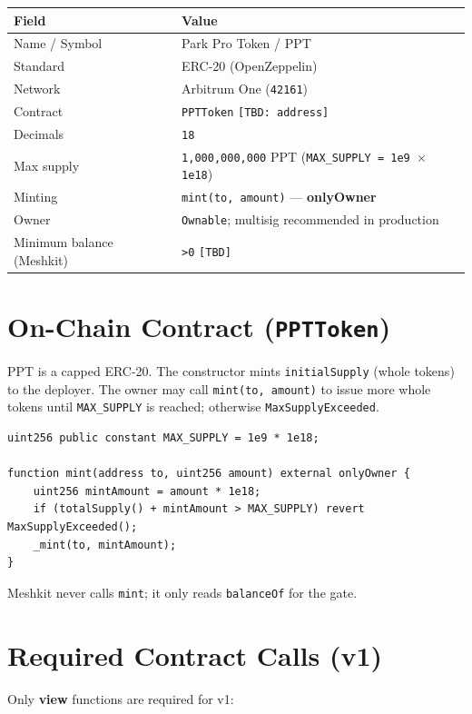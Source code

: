 \documentclass[11pt,a4paper,openany]{report}
\begin{document}
\begin{center}
\begin{tabular}{@{}ll@{}}
\toprule
\textbf{Field} & \textbf{Value} \\
\midrule
Name / Symbol & Park Pro Token / PPT \\
Standard & ERC-20 (OpenZeppelin) \\
Network & Arbitrum One (\texttt{42161}) \\
Contract & \texttt{PPTToken} \texttt{[TBD: address]} \\
Decimals & \texttt{18} \\
Max supply & \texttt{1{,}000{,}000{,}000} PPT (\texttt{MAX\_SUPPLY = 1e9 $\times$ 1e18}) \\
Minting & \texttt{mint(to, amount)} --- \textbf{onlyOwner} \\
Owner & \texttt{Ownable}; multisig recommended in production \\
Minimum balance (Meshkit) & \texttt{>0} \texttt{[TBD]} \\
\bottomrule
\end{tabular}
\end{center}

\section{On-Chain Contract (\texttt{PPTToken})}

PPT is a capped ERC-20. The constructor mints \texttt{initialSupply} (whole tokens) to the deployer. The owner may call \texttt{mint(to, amount)} to issue more whole tokens until \texttt{MAX\_SUPPLY} is reached; otherwise \texttt{MaxSupplyExceeded}.

\begin{lstlisting}[language={}]
uint256 public constant MAX_SUPPLY = 1e9 * 1e18;

function mint(address to, uint256 amount) external onlyOwner {
    uint256 mintAmount = amount * 1e18;
    if (totalSupply() + mintAmount > MAX_SUPPLY) revert MaxSupplyExceeded();
    _mint(to, mintAmount);
}
\end{lstlisting}

Meshkit never calls \texttt{mint}; it only reads \texttt{balanceOf} for the gate.

\section{Required Contract Calls (v1)}

Only \textbf{view} functions are required for v1:
\end{document}
